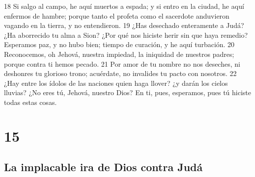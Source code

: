 18 Si salgo al campo, he aquí muertos a espada; y si entro en la ciudad, he aquí enfermos de hambre; porque tanto el profeta como el sacerdote anduvieron vagando en la tierra, y no entendieron.
19 ¿Has desechado enteramente a Judá? ¿Ha aborrecido tu alma a Sion? ¿Por qué nos hiciste herir sin que haya remedio? Esperamos paz, y no hubo bien; tiempo de curación, y he aquí turbación.
20 Reconocemos, oh Jehová, nuestra impiedad, la iniquidad de nuestros padres; porque contra ti hemos pecado.
21 Por amor de tu nombre no nos deseches, ni deshonres tu glorioso trono; acuérdate, no invalides tu pacto con nosotros.
22 ¿Hay entre los ídolos de las naciones quien haga llover? ¿y darán los cielos lluvias? ¿No eres tú, Jehová, nuestro Dios? En ti, pues, esperamos, pues tú hiciste todas estas cosas.

\chapter{15}

\section*{La implacable ira de Dios contra Judá}

